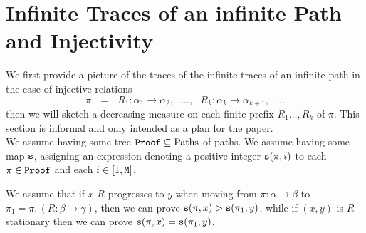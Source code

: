 \documentclass{lmcs}
\begin{document}
\section{Infinite Traces of an infinite Path and Injectivity}
We first provide a picture of the traces of the infinite traces of an infinite path in the case of 
injective relations
$$
\pi \ \ \ 
= \ \ \ 
R_1:\alpha_1 \rightarrow \alpha_2, \ \ \ 
\ldots, \ \ \ 
R_k:\alpha_k \rightarrow \alpha_{k+1}, \ \ \ 
\ldots
$$
then we will sketch a decreasing measure on each finite prefix $R_1 \ldots, R_k$ of $\pi$. 
This section is informal and only intended as a plan for the paper.
\\ 


We assume having some tree ${\tt Proof} \subseteq {\rm Paths}$ of paths. We assume having
some map ${\tt s}$, assigning an expression denoting a positive integer 
${\tt s}(\pi,i)$ to each $\pi \in {\tt Proof}$ and each $i \in [1,{\tt M}]$.

We assume that if $x$ $R$-progresses to $y$ when moving from $\pi:\alpha \rightarrow \beta$ 
to $\pi_1 = \pi, (R:\beta \rightarrow \gamma)$, 
then we can prove ${\tt s}(\pi, x) > {\tt s}(\pi_1, y)$, while if $(x,y)$ is $R$-stationary then 
we can prove ${\tt s}(\pi, x) = {\tt s}(\pi_1, y)$. 
\end{document}
